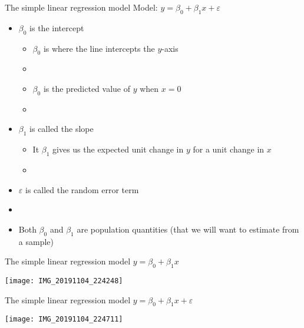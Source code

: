 \documentclass[xcolor=dvipsnames]{beamer}
\begin{document}
\begin{frame}{The simple linear regression model}
Model: $y = \beta_0 + \beta_1 x + \varepsilon$
		\begin{itemize}
			\item $\beta_0$ is the intercept
			\begin{itemize}
				\item $\beta_0$ is where the line intercepts the $y$-axis
				\item[]
				\item $\beta_0$ is the predicted value of $y$ when $x=0$
				\item[]
			\end{itemize} 
			\item $\beta_1$ is called the slope
			\begin{itemize}
				\item It $\beta_1$ gives us the expected unit change in $y$ for a unit change in $x$
				\item[]
			\end{itemize}
			\item $\varepsilon$ is called the random error term
			\item[]
			\item Both $\beta_0$ and $\beta_1$ are population quantities (that we will want to estimate from a sample)
		\end{itemize}
\end{frame}

\begin{frame}{The simple linear regression model}
$y = \beta_0 + \beta_1 x $
	\begin{center}
		\texttt{[image: IMG\_20191104\_224248]}
	\end{center}
\end{frame}

\begin{frame}{The simple linear regression model}
$y = \beta_0 + \beta_1 x + \varepsilon$
\begin{center}
	\texttt{[image: IMG\_20191104\_224711]}
\end{center}
\end{frame}
\end{document}
